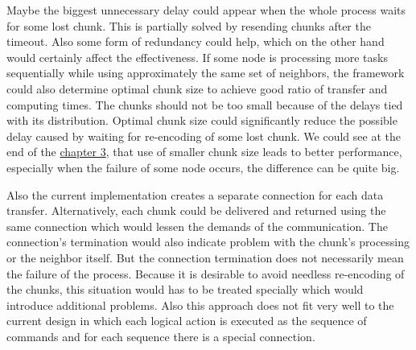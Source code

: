 Maybe the biggest unnecessary delay could appear when the whole process
waits for some lost chunk. This is partially solved by resending chunks
after the timeout. Also some form of redundancy could help, which on the
other hand would certainly affect the effectiveness. If some node is
processing more tasks sequentially while using approximately the same
set of neighbors, the framework could also determine optimal chunk size
to achieve good ratio of transfer and computing times. The chunks should
not be too small because of the delays tied with its distribution.
Optimal chunk size could significantly reduce the possible delay caused
by waiting for re-encoding of some lost chunk. We could see at the end
of the \hyperref[interpreting-the-results]{chapter 3}, that use of
smaller chunk size leads to better performance, especially when the
failure of some node occurs, the difference can be quite big.

Also the current implementation creates a separate connection for each
data transfer. Alternatively, each chunk could be delivered and returned
using the same connection which would lessen the demands of the
communication. The connection's termination would also indicate problem
with the chunk's processing or the neighbor itself. But the connection
termination does not necessarily mean the failure of the process.
Because it is desirable to avoid needless re-encoding of the chunks,
this situation would has to be treated specially which would introduce
additional problems. Also this approach does not fit very well to the
current design in which each logical action is executed as the sequence
of commands and for each sequence there is a special connection.
